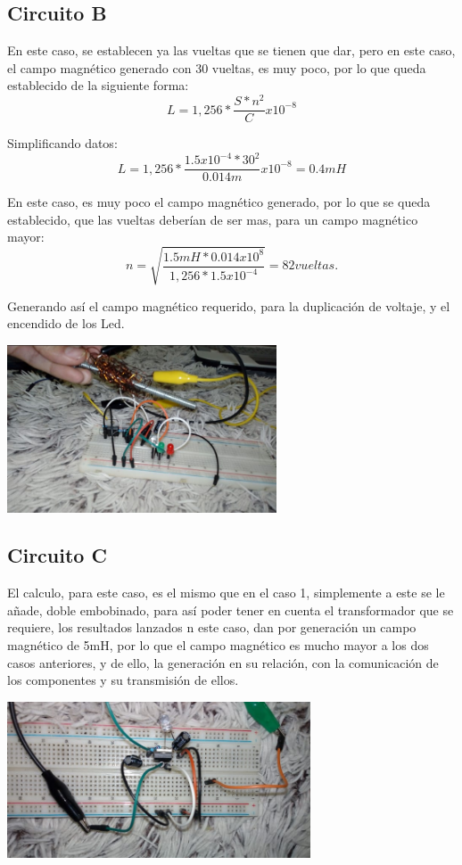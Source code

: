 \documentclass[12pt,letterpaper]{article}
\begin{document}
\subsection{Circuito B}
En este caso, se establecen ya las vueltas que se tienen que dar, pero en este caso, el campo magnético generado con 30 vueltas, es muy poco, por lo que queda establecido de la siguiente forma:\\
$$ L=1,256* \frac{S * n^{2}}{C}x10^{-8} $$

Simplificando datos:\\
$$ L=1,256* \frac{1.5x10^{-4} * 30^{2}}{0.014m}x10^{-8}= 0.4mH $$

En este caso, es muy poco el campo magnético generado, por lo que se queda establecido, que las vueltas deberían de ser mas, para un campo magnético mayor:\\
$$ n=\sqrt{\frac{1.5mH*0.014x10^{8}}{1,256 * 1.5x10^{-4}}}= 82 vueltas. $$

Generando así el campo magnético requerido, para la duplicación de voltaje, y el encendido de los Led.\\

\begin{center}
\includegraphics[width=8cm]{resul2.jpeg} 
\end{center}

\subsection{Circuito C}

El calculo, para este caso, es el mismo que en el caso 1, simplemente a este se le añade, doble embobinado, para así poder tener en cuenta el transformador que se requiere, los resultados lanzados n este caso, dan por generación un campo magnético de 5mH, por lo que el campo magnético es mucho mayor a los dos casos anteriores, y de ello, la generación en su relación, con la comunicación de los componentes y su transmisión de ellos.

\begin{center}
\includegraphics[width=9cm]{resul3.jpeg} 
\end{center}
\end{document}
